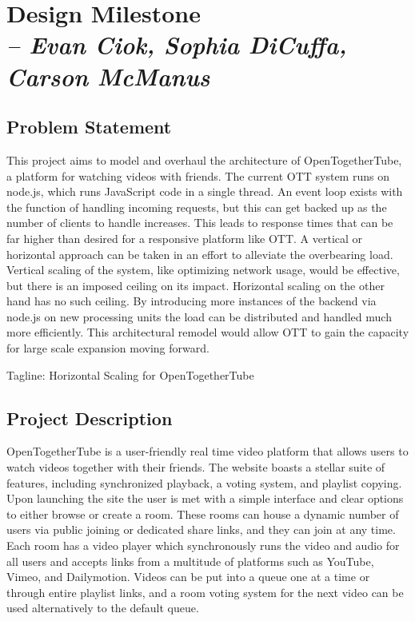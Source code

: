 \chapter{Design Milestone \\
  \small{\textit{-- Evan Ciok, Sophia DiCuffa, Carson McManus}}
  \label{Chapter::designMilestone}}

\section{Problem Statement}

This project aims to model and overhaul the architecture of OpenTogetherTube, a platform for watching videos with
friends. The current OTT system runs on node.js, which runs JavaScript code in a single thread. An event loop exists
with the function of handling incoming requests, but this can get backed up as the number of clients to handle
increases. This leads to response times that can be far higher than desired for a responsive platform like OTT.
A vertical or horizontal approach can be taken in an effort to alleviate the overbearing load. Vertical scaling
of the system, like optimizing network usage, would be effective, but there is an imposed ceiling on its impact.
Horizontal scaling on the other hand has no such ceiling. By introducing more instances of the backend via
node.js on new processing units the load can be distributed and handled much more efficiently. This architectural
remodel would allow OTT to gain the capacity for large scale expansion moving forward.

Tagline: Horizontal Scaling for OpenTogetherTube

\section{Project Description}

OpenTogetherTube is a user-friendly real time video platform that allows users to watch videos together with their
friends. The website boasts a stellar suite of features, including synchronized playback, a voting system, and
playlist copying. Upon launching the site the user is met with a simple interface and clear options to either
browse or create a room. These rooms can house a dynamic number of users via public joining or dedicated share links,
and they can join at any time. Each room has a video player which synchronously runs the video and audio for all
users and accepts links from a multitude of platforms such as YouTube, Vimeo, and Dailymotion. Videos can be put
into a queue one at a time or through entire playlist links, and a room voting system for the next video can be used
alternatively to the default queue.

